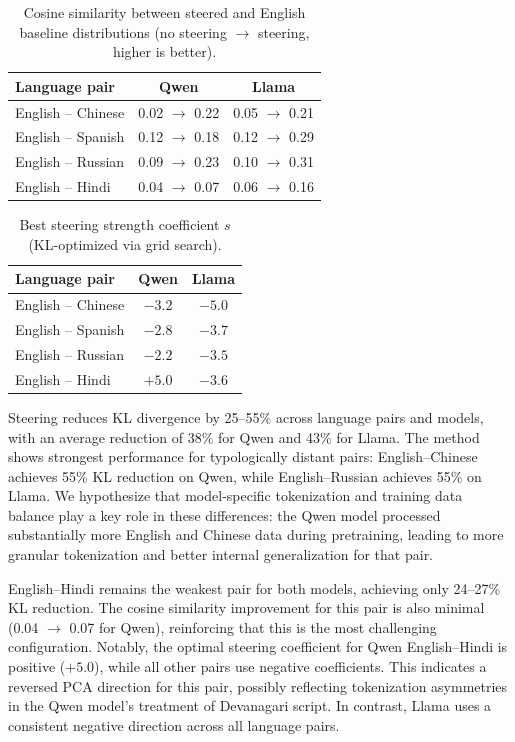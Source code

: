 \begin{table}[!htb]
    \centering
    \caption{Cosine similarity between steered and English baseline distributions (no steering $\rightarrow$ steering, higher is better).}
    \begin{tabular}{lcc}
    \toprule
    Language pair & Qwen & Llama \\
    \midrule
    English -- Chinese & 0.02 $\rightarrow$ 0.22 & 0.05 $\rightarrow$ 0.21 \\
    English -- Spanish & 0.12 $\rightarrow$ 0.18 & 0.12 $\rightarrow$ 0.29 \\
    English -- Russian & 0.09 $\rightarrow$ 0.23 & 0.10 $\rightarrow$ 0.31 \\
    English -- Hindi & 0.04 $\rightarrow$ 0.07 & 0.06 $\rightarrow$ 0.16 \\
    \bottomrule
    \end{tabular}
    \label{tab:steering_cos}
\end{table}

\begin{table}[!htb]
    \centering
    \caption{Best steering strength coefficient $s$ (KL-optimized via grid search).}
    \begin{tabular}{lcc}
    \toprule
    Language pair & Qwen & Llama \\
    \midrule
    English -- Chinese & $-3.2$ & $-5.0$ \\
    English -- Spanish & $-2.8$ & $-3.7$ \\
    English -- Russian & $-2.2$ & $-3.5$ \\
    English -- Hindi & $+5.0$ & $-3.6$ \\
    \bottomrule
    \end{tabular}
    \label{tab:steering_coeff}
\end{table}

Steering reduces KL divergence by 25--55\% across language pairs and models, with an average reduction of 38\% for Qwen and 43\% for Llama. The method shows strongest performance for typologically distant pairs: English--Chinese achieves 55\% KL reduction on Qwen, while English--Russian achieves 55\% on Llama. We hypothesize that model-specific tokenization and training data balance play a key role in these differences: the Qwen model processed substantially more English and Chinese data during pretraining, leading to more granular tokenization and better internal generalization for that pair.

English--Hindi remains the weakest pair for both models, achieving only 24--27\% KL reduction. The cosine similarity improvement for this pair is also minimal (0.04 $\rightarrow$ 0.07 for Qwen), reinforcing that this is the most challenging configuration. Notably, the optimal steering coefficient for Qwen English--Hindi is positive ($+5.0$), while all other pairs use negative coefficients. This indicates a reversed PCA direction for this pair, possibly reflecting tokenization asymmetries in the Qwen model's treatment of Devanagari script. In contrast, Llama uses a consistent negative direction across all language pairs.

